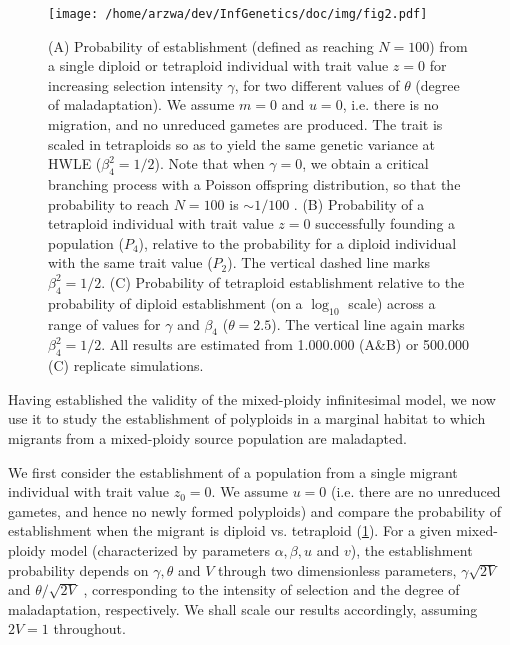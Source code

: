 \documentclass[12pt,a4paper]{article}
\begin{document}
\begin{figure}[t]
\centering
\texttt{[image: /home/arzwa/dev/InfGenetics/doc/img/fig2.pdf]}
\caption{
    (A) Probability of establishment (defined as reaching $N=100$) from a
    single diploid or tetraploid individual with trait value $z=0$ for
    increasing selection intensity $\gamma$, for two different values of
    $\theta$ (degree of maladaptation).  We assume $m=0$ and $u=0$, i.e. there
    is no migration, and no unreduced gametes are produced. The trait is scaled
    in tetraploids so as to yield the same genetic variance at HWLE ($\beta_4^2 =
    1/2$).
    Note that when $\gamma = 0$, we obtain a critical branching process with a
    Poisson offspring distribution, so that the probability to reach $N=100$ is
    $\sim 1/100$ \citep{barton2018}.  
(B) Probability of a tetraploid individual with trait value $z = 0$
    successfully founding a population ($P_4$), relative to the probability for
    a diploid individual with the same trait value ($P_2$).  The vertical
    dashed line marks $\beta_4^2=1/2$.
(C) Probability of tetraploid establishment relative to the probability of
    diploid establishment (on a $\log_{10}$ scale) across a range of values for
    $\gamma$ and $\beta_4$ ($\theta=2.5$). The vertical line again marks
    $\beta_4^2=1/2$.  All results are estimated from 1.000.000 (A\&B) or
    500.000 (C) replicate simulations.
\label{fig:est1}}
\end{figure}


Having established the validity of the mixed-ploidy infinitesimal model, we now
use it to study the establishment of polyploids in a marginal habitat to which
migrants from a mixed-ploidy source population are maladapted.

We first consider the establishment of a population from a single migrant
individual with trait value $z_0 = 0$.
We assume $u=0$ (i.e. there are no unreduced gametes, and hence no newly formed
polyploids) and compare the probability of establishment when the migrant
is diploid vs. tetraploid (\cref{fig:est1}).
For a given mixed-ploidy model (characterized by parameters $\alpha, \beta,
u$ and $v$), the establishment probability depends on $\gamma, \theta$ and $V$
through two dimensionless parameters, $\gamma\sqrt{2V}$ and $\theta/\sqrt{2V}$
\citep{barton2018}, corresponding to the intensity of selection and the degree
of maladaptation, respectively.
We shall scale our results accordingly, assuming $2V=1$ throughout.
\end{document}
